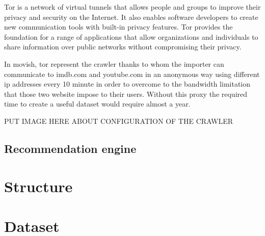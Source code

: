 Tor \cite{tor} is a network of virtual tunnels that allows people and groups to improve their privacy and security on the Internet. It also enables software developers to create new communication tools with built-in privacy features. Tor provides the foundation for a range of applications that allow organizations and individuals to share information over public networks without compromising their privacy.

In movish, tor represent the crawler thanks to whom the importer can communicate to imdb.com and youtube.com in an anonymous way using different ip addresses every 10 minute in order to overcome to the bandwidth limitation that those two website impose to their users. Without this proxy the required time to create a useful dataset would require almost a year.

PUT IMAGE HERE ABOUT CONFIGURATION OF THE CRAWLER

\subsection{Recommendation engine}
\label{sec:recommendation_engine}

\section{Structure}
\label{sec:structure}

\section{Dataset}
\label{sec:dataset}



\acresetall